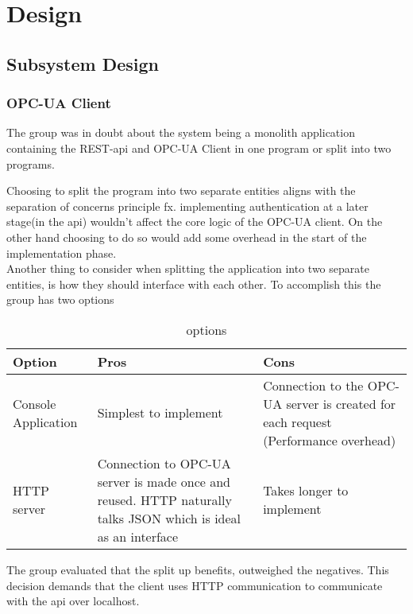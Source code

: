 \section{Design}
\subsection{Subsystem Design}
\subsubsection{OPC-UA Client}
The group was in doubt about the system being a monolith application containing 
the REST-api and OPC-UA Client in one program or split into two programs.

Choosing to split the program into two separate entities aligns with the 
separation of concerns principle fx. implementing authentication at a later 
stage(in the api) wouldn't affect the core logic of the OPC-UA client. On the 
other hand choosing to do so would add some overhead in the start of the 
implementation phase. \\

Another thing to consider when splitting the application into two separate 
entities, is how they should interface with each other. To accomplish this the 
group has two options 

\begin{table}[ht]
    \begin{tabularx}{\textwidth}{|>{\RaggedRight}X|>{\RaggedRight}X|>{\RaggedRight}X|}
        \hline
        \textbf{Option} & \textbf{Pros} & \textbf{Cons} \\
        \hline
        Console Application & Simplest to implement & Connection to the OPC-UA 
        server is created for each request (Performance overhead)\\
        \hline
        HTTP server & Connection to OPC-UA server is made once and reused. HTTP
        naturally talks JSON which is ideal as an interface & Takes longer to 
        implement \\
        \hline
    \end{tabularx}
    \caption{options}
    \label{someLabel}
\end{table}

The group evaluated that the split up benefits, outweighed the negatives. This 
decision demands that the client uses HTTP communication to communicate with the
api over localhost. 



